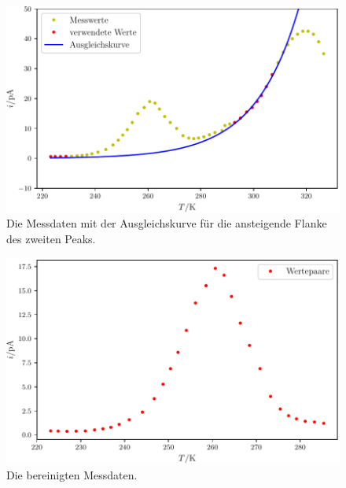 \begin{figure}
	\centering
	\includegraphics[width=\linewidth-60pt,height=\textheight-60pt,keepaspectratio]{content/images/plot1exp.pdf}
	\caption{Die Messdaten mit der Ausgleichskurve für die ansteigende Flanke des zweiten Peaks.}
	\label{fig:plot1exp}
\end{figure}

\begin{figure}
	\centering
	\includegraphics[width=\linewidth-60pt,height=\textheight-60pt,keepaspectratio]{content/images/bereinigt1.pdf}
	\caption{Die bereinigten Messdaten.}
	\label{fig:bereinigt1}
\end{figure}

